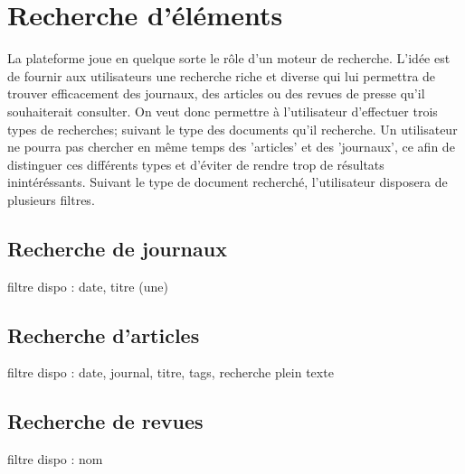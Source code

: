 \section{Recherche d'éléments}
\label{sec:recherche}

La plateforme joue en quelque sorte le rôle d'un moteur de recherche. L'idée est de fournir aux utilisateurs une recherche riche et diverse qui lui permettra de trouver efficacement des journaux, des articles ou des revues de presse qu'il souhaiterait consulter. On veut donc permettre à l'utilisateur d'effectuer trois types de recherches; suivant le type des documents qu'il recherche. Un utilisateur ne pourra pas chercher en même temps des 'articles' et des 'journaux', ce afin de distinguer ces différents types et d'éviter de rendre trop de résultats inintéréssants. Suivant le type de document recherché, l'utilisateur disposera de plusieurs filtres.

\subsection{Recherche de journaux}
\label{sec:recherche_journal}

filtre dispo : date, titre (une)

\subsection{Recherche d'articles}
\label{sec:recherche_article}

filtre dispo : date, journal, titre, tags, recherche plein texte

\subsection{Recherche de revues}
\label{sec:recherche_revue}

filtre dispo : nom

